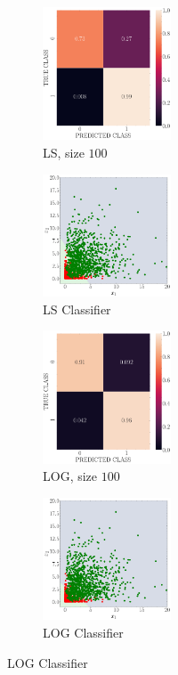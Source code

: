 \documentclass[12pt, a4 paper]{article}
\begin{document}
\begin{figure}[!htbp]
    \begin{subfigure}[!htbp]{0.2\textwidth}
       \centering
       \includegraphics[width=1.5in]{../results/ex1/acc_LS_dataset_Gamma_size_100.pdf}
       \caption{LS, size $100$}
       \label{fig:LS_P1a_100}
    \end{subfigure}
\quad
    \begin{subfigure}[!htbp]{0.2\textwidth}
       \centering
       \includegraphics[width=1.5in]{../results/ex1/samples_LS_dataset_Gamma_size_100.pdf}
       \caption{LS Classifier}
       \label{fig:LSD_P1a_100}
    \end{subfigure}
\quad
    \begin{subfigure}[!htbp]{0.2\textwidth}
       \centering
       \includegraphics[width=1.5in]{../results/ex1/acc_LOG_dataset_Gamma_size_100.pdf}
       \caption{LOG, size $100$}
       \label{fig:LOG_P1a_100}
    \end{subfigure}
\quad
    \begin{subfigure}[!htbp]{0.2\textwidth}
       \centering
       \includegraphics[width=1.5in]{../results/ex1/samples_LOG_dataset_Gamma_size_100.pdf}
       \caption{LOG Classifier}
       \label{fig:LOGD_P1a_100}
    \end{subfigure} 
    

\end{figure}
\end{document}
